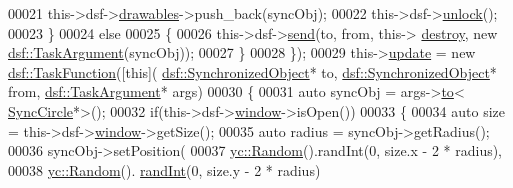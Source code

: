 \begin{DoxyCode}
00021                                                  this->dsf->\hyperlink{classdsf_1_1sfml_1_1_render_window_a745350dfdb1f752359f9055d714c453d}{drawables}->push\_back(syncObj);
00022                                                  this->dsf->\hyperlink{classdsf_1_1_lock_a3d03f801920d458b3c3c402a0f4af323}{unlock}();
00023                                              \}
00024                                              \textcolor{keywordflow}{else}
00025                                              \{
00026                                                  this->dsf->\hyperlink{classdsf_1_1_dual_state_framework_a3063d7f0ce537eb44dc2bdcec816a36b}{send}(to, from, this->
      \hyperlink{class_random_circle_manager_af87d7d788cd9c4a1a37a30ad959cc445}{destroy}, \textcolor{keyword}{new} \hyperlink{classyc_1_1_any}{dsf::TaskArgument}(syncObj));
00027                                              \}
00028                                          \});
00029     this->\hyperlink{class_random_circle_manager_a05c52359eec88a70be1296bfbeeb17c7}{update} = \textcolor{keyword}{new} \hyperlink{namespacedsf_aa16e735f29587f4485b56fc46746f7a9}{dsf::TaskFunction}([\textcolor{keyword}{this}](
      \hyperlink{classdsf_1_1_synchronized_object}{dsf::SynchronizedObject}* to, \hyperlink{classdsf_1_1_synchronized_object}{dsf::SynchronizedObject}* from, 
      \hyperlink{classyc_1_1_any}{dsf::TaskArgument}* args)
00030                                          \{
00031                                              \textcolor{keyword}{auto} syncObj = args->\hyperlink{classyc_1_1_any_a3db663604505ef8d7e84dd41d5bfcc75}{to}<
      \hyperlink{class_sync_circle}{SyncCircle}*>();
00032                                              \textcolor{keywordflow}{if}(this->dsf->\hyperlink{classdsf_1_1sfml_1_1_render_window_a2c04b61ca1bfba140120001c4a9a30e1}{window}->isOpen())
00033                                              \{
00034                                                  \textcolor{keyword}{auto} size = this->dsf->\hyperlink{classdsf_1_1sfml_1_1_render_window_a2c04b61ca1bfba140120001c4a9a30e1}{window}->getSize();
00035                                                  \textcolor{keyword}{auto} radius = syncObj->getRadius();
00036                                                  syncObj->setPosition(
00037                                                                       \hyperlink{classyc_1_1_random}{yc::Random}().randInt(0, 
      size.x - 2 * radius),
00038                                                                       \hyperlink{classyc_1_1_random}{yc::Random}().
      \hyperlink{classyc_1_1_random_a8cf4d84430a8a030f93078d439d819b8}{randInt}(0, size.y - 2 * radius)

\end{DoxyCode}
